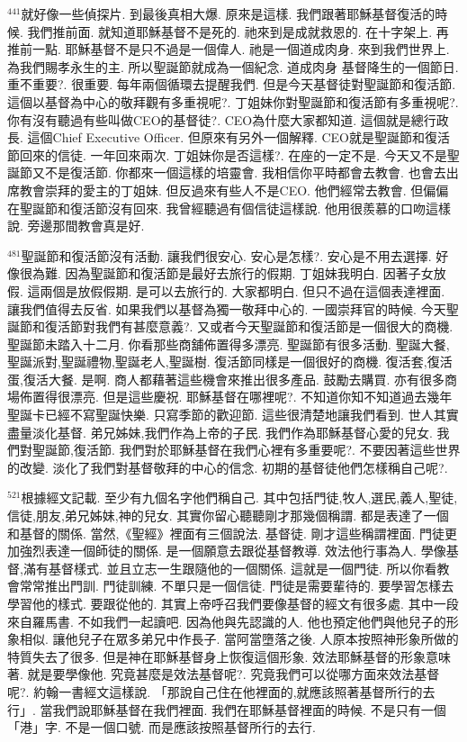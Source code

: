 \documentclass{book}
\begin{document}
$^{441}$就好像一些偵探片.
到最後真相大爆.
原來是這樣.
我們跟著耶穌基督復活的時候.
我們推前面.
就知道耶穌基督不是死的.
祂來到是成就救恩的.
在十字架上.
再推前一點.
耶穌基督不是只不過是一個偉人.
祂是一個道成肉身.
來到我們世界上.
為我們賜孝永生的主.
所以聖誕節就成為一個紀念.
道成肉身 基督降生的一個節日.
重不重要?.
很重要.
每年兩個循環去提醒我們.
但是今天基督徒對聖誕節和復活節.
這個以基督為中心的敬拜觀有多重視呢?.
丁姐妹你對聖誕節和復活節有多重視呢?.
你有沒有聽過有些叫做CEO的基督徒?.
CEO為什麼大家都知道.
這個就是總行政長.
這個Chief Executive Officer.
但原來有另外一個解釋.
CEO就是聖誕節和復活節回來的信徒.
一年回來兩次.
丁姐妹你是否這樣?.
在座的一定不是.
今天又不是聖誕節又不是復活節.
你都來一個這樣的培靈會.
我相信你平時都會去教會.
也會去出席教會崇拜的愛主的丁姐妹.
但反過來有些人不是CEO.
他們經常去教會.
但偏偏在聖誕節和復活節沒有回來.
我曾經聽過有個信徒這樣說.
他用很羨慕的口吻這樣說.
旁邊那間教會真是好.

$^{481}$聖誕節和復活節沒有活動.
讓我們很安心.
安心是怎樣?.
安心是不用去選擇.
好像很為難.
因為聖誕節和復活節是最好去旅行的假期.
丁姐妹我明白.
因著子女放假.
這兩個是放假假期.
是可以去旅行的.
大家都明白.
但只不過在這個表達裡面.
讓我們值得去反省.
如果我們以基督為獨一敬拜中心的.
一國崇拜官的時候.
今天聖誕節和復活節對我們有甚麼意義?.
又或者今天聖誕節和復活節是一個很大的商機.
聖誕節未踏入十二月.
你看那些商舖佈置得多漂亮.
聖誕節有很多活動.
聖誕大餐,聖誕派對,聖誕禮物,聖誕老人,聖誕樹.
復活節同樣是一個很好的商機.
復活套,復活蛋,復活大餐.
是啊.
商人都藉著這些機會來推出很多產品.
鼓勵去購買.
亦有很多商場佈置得很漂亮.
但是這些慶祝.
耶穌基督在哪裡呢?.
不知道你知不知道過去幾年聖誕卡已經不寫聖誕快樂.
只寫季節的歡迎節.
這些很清楚地讓我們看到.
世人其實盡量淡化基督.
弟兄姊妹,我們作為上帝的子民.
我們作為耶穌基督心愛的兒女.
我們對聖誕節,復活節.
我們對於耶穌基督在我們心裡有多重要呢?.
不要因著這些世界的改變.
淡化了我們對基督敬拜的中心的信念.
初期的基督徒他們怎樣稱自己呢?.

$^{521}$根據經文記載.
至少有九個名字他們稱自己.
其中包括門徒,牧人,選民,義人,聖徒,信徒,朋友,弟兄姊妹,神的兒女.
其實你留心聽聽剛才那幾個稱謂.
都是表達了一個和基督的關係.
當然,《聖經》裡面有三個說法.
基督徒.
剛才這些稱謂裡面.
門徒更加強烈表達一個師徒的關係.
是一個願意去跟從基督教導.
效法他行事為人.
學像基督,滿有基督樣式.
並且立志一生跟隨他的一個關係.
這就是一個門徒.
所以你看教會常常推出門訓.
門徒訓練.
不單只是一個信徒.
門徒是需要輩待的.
要學習怎樣去學習他的樣式.
要跟從他的.
其實上帝呼召我們要像基督的經文有很多處.
其中一段來自羅馬書.
不如我們一起讀吧.
因為他與先認識的人.
他也預定他們與他兒子的形象相似.
讓他兒子在眾多弟兄中作長子.
當阿當墮落之後.
人原本按照神形象所做的特質失去了很多.
但是神在耶穌基督身上恢復這個形象.
效法耶穌基督的形象意味著.
就是要學像他.
究竟甚麼是效法基督呢?.
究竟我們可以從哪方面來效法基督呢?.
約翰一書經文這樣說.
「那說自己住在他裡面的,就應該照著基督所行的去行」.
當我們說耶穌基督在我們裡面.
我們在耶穌基督裡面的時候.
不是只有一個「港」字.
不是一個口號.
而是應該按照基督所行的去行.
\end{document}
